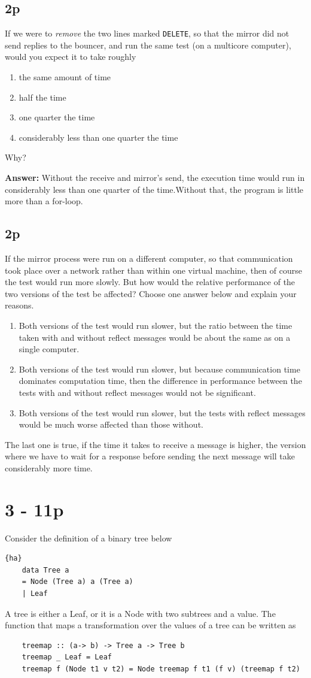 \subsection{2p}
If we were to \textit{remove} the two lines marked \lstinline{DELETE}, so that the mirror did not send replies to the bouncer, and run the same test (on a multicore computer), would you expect it to take roughly
\begin{enumerate}[i]
	\item the same amount of time
	\item half the time
	\item one quarter the time
	\item considerably less than one quarter the time
\end{enumerate}
Why?

\textbf{Answer: } Without the receive and mirror's send, the execution time would run in considerably less than one quarter of the time.Without that, the program is little more than a for-loop.

\subsection{2p}
If the mirror process were run on a different computer, so that communication took place over a network rather than within one virtual machine, then of course the test would run more slowly. But how would the relative performance of the two versions of the test be affected? Choose one answer below and explain your reasons.
\begin{enumerate}[i]
	\item Both versions of the test would run slower, but the ratio between the time taken with and without reflect messages would be about the same as on a single computer.
	\item Both versions of the test would run slower, but because communication time dominates computation time, then the difference in performance between the tests with and without reflect messages would not be significant.
	\item Both versions of the test would run slower, but the tests with reflect messages would be much worse affected than those without.
\end{enumerate}
The last one is true, if the time it takes to receive a message is higher, the version where we have to wait for a response before sending the next message will take considerably more time.

\section{3 - 11p}
Consider the definition of a binary tree below
\begin{lstlisting}{ha}
	data Tree a
	= Node (Tree a) a (Tree a)
	| Leaf
\end{lstlisting}
A tree is either a Leaf, or it is a Node with two subtrees and a value. The function that maps a transformation over the values of a tree can be written as \begin{lstlisting}
	treemap :: (a-> b) -> Tree a -> Tree b
	treemap _ Leaf = Leaf
	treemap f (Node t1 v t2) = Node treemap f t1 (f v) (treemap f t2)
\end{lstlisting}
